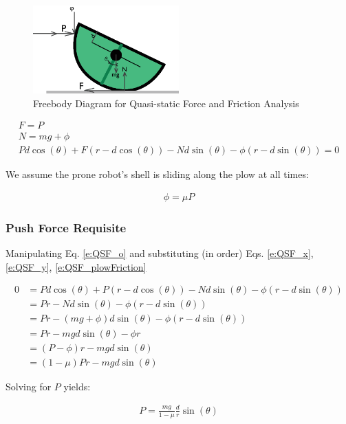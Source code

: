 \documentclass[letterpaper]{report}
\begin{document}
\begin{figure}[ht]
\centering
\includegraphics[width=0.5\textwidth]{QS_FreeBodyDiagram2.eps}
\caption{\label{f:QS_FBD}Freebody Diagram for Quasi-static Force and Friction Analysis}
\end{figure}

\begin{align}
  F = P \label{e:QSF_x} \\
  N = mg + \phi \label{e:QSF_y} \\
  P d \cos(\theta) + F(r - d \cos(\theta)) - N d \sin(\theta) - \phi (r - d \sin(\theta)) = 0 \label{e:QSF_o}
\end{align}

We assume the prone robot's shell is sliding along the plow at all times:

\begin{align}
  \phi = \mu P \label{e:QSF_plowFriction}
\end{align}

\subsubsection{Push Force Requisite}
Manipulating Eq. \ref{e:QSF_o} and substituting (in order) Eqs. \ref{e:QSF_x}, \ref{e:QSF_y}, \ref{e:QSF_plowFriction}

\begin{align}
  0 &= P d \cos(\theta) + P(r - d \cos(\theta)) - N d \sin(\theta) - \phi (r - d \sin(\theta))
  \\&= Pr - N d \sin(\theta) - \phi (r - d \sin(\theta))
  \\&= Pr - (mg + \phi) d \sin(\theta) - \phi (r - d \sin(\theta))
  \\&= Pr - mg d \sin(\theta) - \phi r
  \\&= (P - \phi)r - mg d \sin(\theta)
  \\&= (1-\mu) P r - mg d \sin(\theta)
\end{align}

Solving for $P$ yields:

\begin{align}
  P = \frac{mg}{1-\mu} \frac{d}{r} \sin(\theta)
\end{align}
\end{document}

